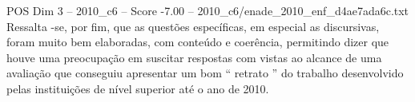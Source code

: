 \begin{textsample}{POS Dim 3 – 2010\_c6 – Score -7.00 – 2010\_c6/enade\_2010\_enf\_d4ae7ada6c.txt}
Ressalta -se, por fim, que as questões específicas, em especial as discursivas, foram muito bem elaboradas, com conteúdo e coerência, permitindo dizer que houve uma preocupação em suscitar respostas com vistas ao alcance de uma avaliação que conseguiu apresentar um bom “ retrato ” do trabalho desenvolvido pelas instituições de nível superior até o ano de 2010.

\end{textsample}
